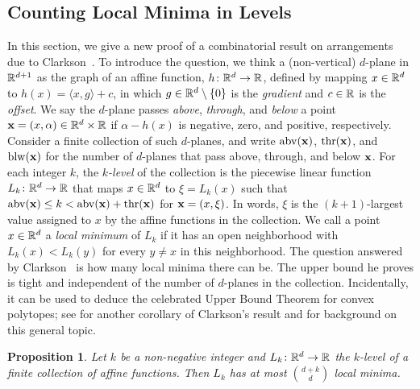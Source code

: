 \documentclass[10pt,a4paper]{article}
\newtheorem{proposition}{Proposition}[section]
\newcommand {\mm}[1] {\ifmmode{#1}\else{\mbox{\(#1\)}}\fi}
\newcommand {\scalprod}[2] {{\langle #1 , #2 \rangle}}
\theoremstyle{plain}
\newcommand{\Rspace}        {\mm{{\mathbb R}}}
\newcommand{\xxx}           {\mm{\bf{x}}}
\newcommand{\Above}[1]      {\mm{{\rm abv}{({#1})}}}
\newcommand{\Through}[1]    {\mm{{\rm thr}{({#1})}}}
\newcommand{\Below}[1]      {\mm{{\rm blw}{({#1})}}}
\begin{document}
\subsection{Counting Local Minima in Levels}
\label{sec:4.2}
In this section, we give a new proof of a combinatorial result on arrangements due to Clarkson~\cite{Cla93}.
To introduce the question, we think a (non-vertical) $d$-plane in $\Rspace^{d+1}$ as the graph of an affine function, $h \colon \Rspace^d \to \Rspace$, defined by mapping $x \in \Rspace^d$ to $h(x) = \scalprod{x}{g} + c$, in which $g \in \Rspace^d \setminus \{0\}$ is the \emph{gradient} and $c \in \Rspace$ is the \emph{offset}.
We say the $d$-plane passes \emph{above}, \emph{through}, and \emph{below} a point $\xxx = (x, \alpha) \in \Rspace^d \times \Rspace$ if $\alpha - h(x)$ is negative, zero, and positive, respectively.
%
Consider a finite collection of such $d$-planes, and write $\Above{\xxx}$, $\Through{\xxx}$, and $\Below{\xxx}$ for the number of $d$-planes that pass above, through, and below $\xxx$.
For each integer $k$, the \emph{$k$-level} of the collection is the piecewise linear function $L_k \colon \Rspace^d \to \Rspace$ that maps $x \in \Rspace^d$ to $\xi = L_k(x)$ such that $\Above{\xxx} \leq k < \Above{\xxx} + \Through{\xxx}$ for $\xxx = (x, \xi)$.
In words, $\xi$ is the $(k+1)$-largest value assigned to $x$ by the affine functions in the collection.
\smallskip
We call a point $x \in \Rspace^d$ a \emph{local minimum} of $L_k$ if it has an open neighborhood with $L_k(x) < L_k(y)$ for every $y \neq x$ in this neighborhood.
The question answered by Clarkson~\cite{Cla93} is how many local minima there can be.
The upper bound he proves is tight and independent of the number of $d$-planes in the collection.
Incidentally, it can be used to deduce the celebrated Upper Bound Theorem for convex polytopes; see \cite{ANPS93} for another corollary of Clarkson's result and \cite{Zie95} for background on this general topic.
\begin{proposition}
  \label{prop:counting_minima_in_levels}
  Let $k$ be a non-negative integer and $L_k \colon \Rspace^d \to \Rspace$ the $k$-level of a finite collection of affine functions.
  Then $L_k$ has at most $\binom{d+k}{d}$ local minima.
\end{proposition}
\end{document}
